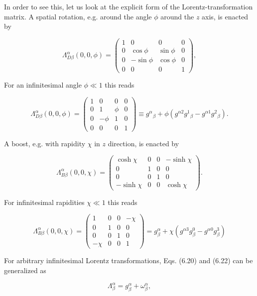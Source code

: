 \documentclass[10pt, letterpaper]{article}
\begin{document}
In order to see this, let us look at the explicit form of the Lorentz-transformation matrix. A spatial rotation, e.g. around the angle $\phi$ around the $z$ axis, is enacted by

$$
\Lambda_{D \beta}^{\alpha}(0,0, \phi)=\left(\begin{array}{cccc}
1 & 0 & 0 & 0 \\
0 & \cos \phi & \sin \phi & 0 \\
0 & -\sin \phi & \cos \phi & 0 \\
0 & 0 & 0 & 1
\end{array}\right),
$$

For an infinitesimal angle $\phi \ll 1$ this reads

$$
\Lambda_{D \beta}^{\alpha}(0,0, \phi)=\left(\begin{array}{cccc}
1 & 0 & 0 & 0 \\
0 & 1 & \phi & 0 \\
0 & -\phi & 1 & 0 \\
0 & 0 & 0 & 1
\end{array}\right) \equiv g^{\alpha}{ }_{\beta}+\phi\left(g^{\alpha 2} g^{1}{ }_{\beta}-g^{\alpha 1} g^{2}{ }_{\beta}\right) .
$$

A boost, e.g. with rapidity $\chi$ in $z$ direction, is enacted by

$$
\Lambda_{B \beta}^{\alpha}(0,0, \chi)=\left(\begin{array}{cccc}
\cosh \chi & 0 & 0 & -\sinh \chi \\
0 & 1 & 0 & 0 \\
0 & 0 & 1 & 0 \\
-\sinh \chi & 0 & 0 & \cosh \chi
\end{array}\right) .
$$

For infinitesimal rapidities $\chi \ll 1$ this reads

$$
\Lambda_{B \beta}^{\alpha}(0,0, \chi)=\left(\begin{array}{cccc}
1 & 0 & 0 & -\chi \\
0 & 1 & 0 & 0 \\
0 & 0 & 1 & 0 \\
-\chi & 0 & 0 & 1
\end{array}\right)=g_{\beta}^{\alpha}+\chi\left(g^{\alpha 3} g_{\beta}^{0}-g^{\alpha 0} g_{\beta}^{3}\right)
$$

For arbitrary infinitesimal Lorentz transformations, Eqs. (6.20) and (6.22) can be generalized as

$$
\Lambda_{\beta}^{\alpha}=g_{\beta}^{\alpha}+\omega_{\beta}^{\alpha},
$$
\end{document}
